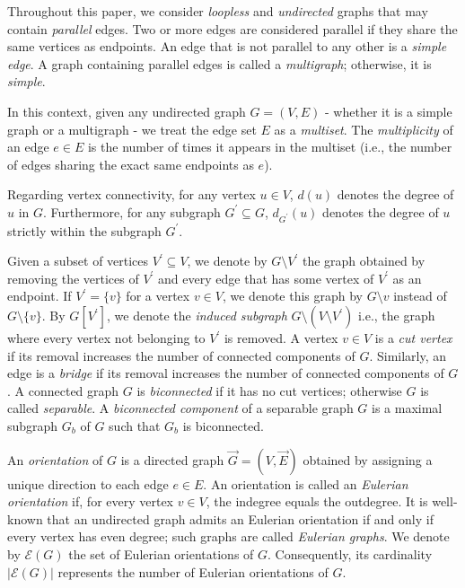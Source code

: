 \documentclass{article}
\begin{document}
        Throughout this paper, we consider \emph{loopless} and \emph{undirected} graphs that may contain \emph{parallel} edges.
        Two or more edges are considered parallel if they share the same vertices as endpoints. 
        An edge that is not parallel to any other is a \emph{simple edge}.
        A graph containing parallel edges is called a \emph{multigraph}; otherwise, it is \emph{simple}.

        In this context, given any undirected graph $G=(V,E)$ - whether it is a simple graph or a multigraph -  we treat the edge set $E$ as a \emph{multiset}. 
        The \emph{multiplicity} of an edge $e \in E$ is the number of times it appears in the multiset (i.e., the number of edges sharing the exact same endpoints as $e$). 


        Regarding vertex connectivity, for any vertex $u \in V$, $d(u)$ denotes the degree of $u$ in $G$. 
        Furthermore, for any subgraph $G^\prime \subseteq G$, $d_{G^\prime}(u)$ denotes the degree of $u$ strictly within the subgraph $G^\prime$.
        
        Given a subset of vertices $V^\prime \subseteq V$, we denote by $G\setminus V^{\prime}$ the graph obtained by removing the vertices of  $V^{\prime}$ and every edge that has some vertex of $V^{\prime}$ as an endpoint.
        If $V^{\prime}=\{v\}$ for a vertex $v\in V$, we denote this graph by $G\setminus v$ instead of $G\setminus \{v\}$.
        By $G[V^{\prime}]$, we denote the \emph{induced subgraph} $G\setminus (V\setminus V^{\prime})$ i.e., the graph where every vertex not belonging to $V^{\prime}$ is removed.
        A vertex $v \in V$ is a \emph{cut vertex} if its removal increases the number of connected components of $G$.
        Similarly, an edge is a \emph{bridge} if its removal increases the number of connected components of $G$.
        A connected graph $G$ is \emph{biconnected} if it has no cut vertices; otherwise $G$ is called \emph{separable}.
        A \emph{biconnected component}  of a separable graph $G$ is a maximal subgraph $G_b$ of $G$ such that $G_b$ is biconnected.
        
        An \emph{orientation} of $G$ is a directed graph $\vec{G}=(V,\vec{E})$ obtained by assigning a unique direction to each edge $e \in E$.
        An orientation is called an \emph{Eulerian orientation} if, for every vertex $v \in V$, the indegree equals the outdegree.  
        It is well-known that an undirected graph admits an Eulerian orientation if and only if every vertex has even degree; such graphs are called \emph{Eulerian graphs}.
        We denote by $\mathcal{E}(G)$ the set of Eulerian orientations of $G$. Consequently, its cardinality $|\mathcal{E}(G)|$ represents the number of Eulerian orientations of $G$.
        
\end{document}

